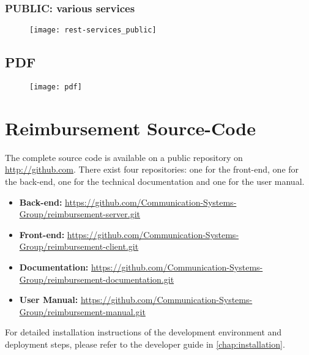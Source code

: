 \subsection{PUBLIC: various services}
\begin{figure}[H]
	{\texttt{[image: rest-services\_public]}}
\end{figure}
\newpage

\section{PDF}
\label{sec:app-pdf}

\begin{figure}[H]
	{\texttt{[image: pdf]}}
\end{figure}
\newpage

\chapter{Reimbursement Source-Code}
\label{github-source}

The complete source code is available on a public repository on \url{http://github.com}. There exist four repositories: one for the front-end, one for the back-end, one for the technical documentation and one for the user manual.

\begin{itemize}
	\item \textbf{Back-end:} \newline \url{https://github.com/Communication-Systems-Group/reimbursement-server.git}
	\item \textbf{Front-end:} \newline \url{https://github.com/Communication-Systems-Group/reimbursement-client.git}
	\item \textbf{Documentation:} \newline \url{https://github.com/Communication-Systems-Group/reimbursement-documentation.git}
	\item \textbf{User Manual:} \newline \url{https://github.com/Communication-Systems-Group/reimbursement-manual.git}
\end{itemize}

For detailed installation instructions of the development environment and deployment steps, please refer to the developer guide in \ref{chap:installation}.

